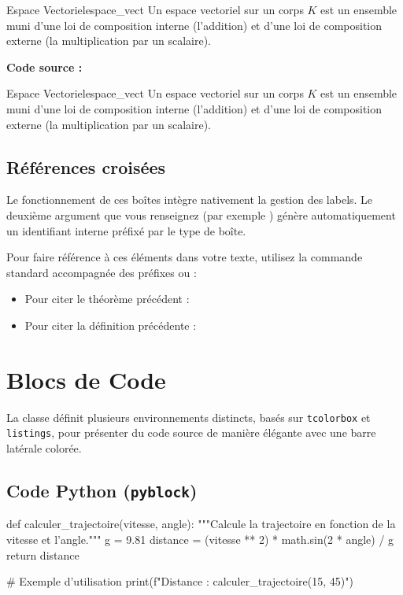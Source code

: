 \begin{myrdef}{Espace Vectoriel}{espace_vect}
  Un espace vectoriel sur un corps $K$ est un ensemble muni d'une loi de composition interne (l'addition) et d'une loi de composition externe (la multiplication par un scalaire).
\end{myrdef}

\textbf{Code source :}
\begin{texblock}
\begin{myrdef}{Espace Vectoriel}{espace_vect}
  Un espace vectoriel sur un corps $K$ est un ensemble muni d'une loi de composition interne (l'addition) et d'une loi de composition externe (la multiplication par un scalaire).
\end{myrdef}
\end{texblock}

\subsection{Références croisées}

Le fonctionnement de ces boîtes intègre nativement la gestion des labels. Le deuxième argument que vous renseignez (par exemple ) génère automatiquement un identifiant interne préfixé par le type de boîte.

Pour faire référence à ces éléments dans votre texte, utilisez la commande standard  accompagnée des préfixes  ou  :

\begin{itemize}
    \item Pour citer le théorème précédent : 
    \item Pour citer la définition précédente : 
\end{itemize}

\section{Blocs de Code}

La classe définit plusieurs environnements distincts, basés sur \texttt{tcolorbox} et \texttt{listings}, pour présenter du code source de manière élégante avec une barre latérale colorée.

\subsection{Code Python (\texttt{pyblock})}
\begin{pyblock}
def calculer_trajectoire(vitesse, angle):
    """Calcule la trajectoire en fonction de la vitesse et l'angle."""
    g = 9.81
    distance = (vitesse ** 2) * math.sin(2 * angle) / g
    return distance

# Exemple d'utilisation
print(f"Distance : {calculer_trajectoire(15, 45)}")
\end{pyblock}

